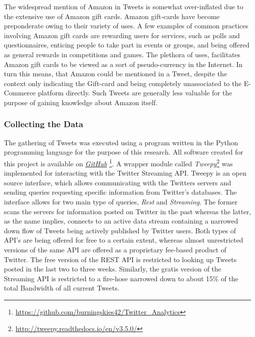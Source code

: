 			\par
			
			The widespread mention of Amazon in Tweets is somewhat over-inflated due to the extensive use of Amazon gift cards. Amazon gift-cards have become preponderate owing to their variety of uses. A few examples of common practices involving Amazon gift cards are rewarding users for services, such as polls and questionnaires, enticing people to take part in events or groups, and being offered as general rewards in competitions and games. The plethora of uses, facilitates Amazon gift cards to be viewed as a sort of pseudo-currency in the Internet. In turn this means, that Amazon could be mentioned in a Tweet, despite the context only indicating the Gift-card and being completely unassociated to the E-Commerce platform directly. Such Tweets are generally less valuable for the purpose of gaining knowledge about Amazon itself.
		
		\subsubsection*{Collecting the Data}
		\label{sec:collect_data}
			The gathering of Tweets was executed using a program written in the Python programming language for the purpose of this research. All software created for this project is available on \href{https://github.com/burningskies42/Twitter_Analytics}{\textit{GitHub}} \footnote{\url{https://github.com/burningskies42/Twitter_Analytics}}. A wrapper module called \textit{Tweepy}\footnote{\url{http://tweepy.readthedocs.io/en/v3.5.0/}} was implemented for interacting with the Twitter Streaming API. Tweepy is an open source interface, which allows communicating with the Twitters servers and sending queries requesting specific information from Twitter's databases. The interface allows for two main type of queries, \textit{Rest} and \textit{Streaming}. The former scans the servers for information posted on Twitter in the past whereas the latter, as the name implies, connects to an active data stream containing a narrowed down flow of Tweets being actively published by Twitter users. Both types of API's are being offered for free to a certain extent, whereas almost unrestricted versions of the same API are offered as a proprietary fee-based product of Twitter. The free version of the REST API is restricted to looking up Tweets posted in the last two to three weeks. Similarly, the gratis version of the Streaming API is restricted to a fire-hose narrowed down to about 15\% of the total Bandwidth of all current Tweets.
			
